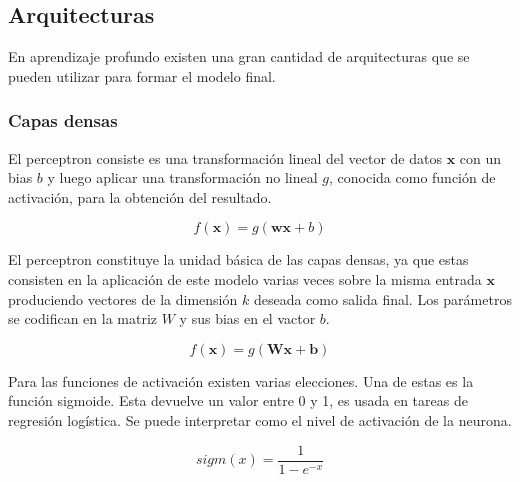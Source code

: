 


\subsection{Arquitecturas}

En aprendizaje profundo existen una gran cantidad de arquitecturas que se pueden utilizar para formar el modelo 
final.

\subsubsection{Capas densas}

El perceptron consiste es una transformación lineal del vector de datos $\textbf{x}$ con un bias $b$ y 
luego aplicar una transformación no lineal $g$, conocida como función de activación, 
para la obtención del resultado.

\begin{equation}
	f(\textbf{x}) = g(\textbf{w}\textbf{x} + b)
\end{equation}\label{eq:perceptron}

El perceptron constituye la unidad básica de las capas densas, ya que estas consisten en la aplicación
de este modelo varias veces sobre la misma entrada $\textbf{x}$ produciendo vectores de la dimensión $k$ 
deseada como salida final. Los parámetros se codifican en la matriz $W$ y sus bias en el vactor $b$.

\begin{equation}
	f(\textbf{x}) = g(\textbf{Wx} + \textbf{b})
\end{equation}\label{eq:dense}

Para las funciones de activación existen varias elecciones. Una de estas es la función sigmoide. 
Esta devuelve un valor entre 0 y 1, es usada en tareas de regresión logística. 
Se puede interpretar como el nivel de activación de la neurona.

\begin{equation}
	sigm(x) = \frac{1}{1-e^{-x}}
\end{equation}\label{eq:sigmoide}

